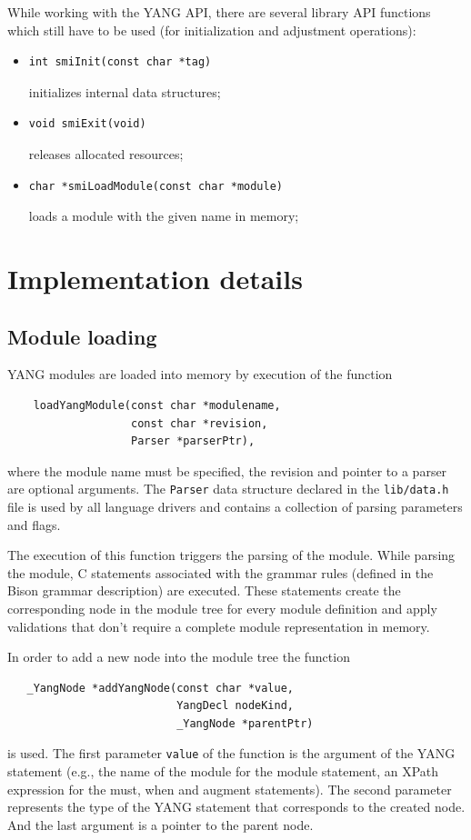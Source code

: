 \documentclass[conference]{IEEEtran}
\begin{document}
While working with the YANG API, there are several library API functions which still have to be used (for initialization and adjustment operations):
\begin{itemize}
\item 
\small
\begin{verbatim}
int smiInit(const char *tag)
\end{verbatim}
\normalsize
initializes internal data structures;

\item 
\small
\begin{verbatim}
void smiExit(void)
\end{verbatim}
\normalsize
releases allocated resources;

\item 
\small
\begin{verbatim}
char *smiLoadModule(const char *module)
\end{verbatim}
\normalsize
loads a module with the given name in memory;
\end{itemize}

\section{Implementation details}
\subsection{Module loading}
YANG modules are loaded into memory by execution of the function 
\small
\begin{verbatim}
    loadYangModule(const char *modulename, 
                   const char *revision, 
                   Parser *parserPtr),
\end{verbatim}
\normalsize
where the module name must be specified, the revision and pointer to a parser are optional arguments. The \texttt{Parser} data structure declared in the \texttt{lib/data.h} file is used by all language drivers and contains a collection of parsing parameters and flags.

The execution of this function triggers the parsing of the module. 
While parsing the module, C statements associated with the grammar rules (defined in the Bison grammar description) are executed. 
These statements create the corresponding node in the module tree for every module definition
and apply validations that don't require a complete module representation in memory.

In order to add a new node into the module tree the function
\small
\begin{verbatim}
   _YangNode *addYangNode(const char *value, 
                          YangDecl nodeKind, 
                          _YangNode *parentPtr)
\end{verbatim}
\normalsize
is used.
The first parameter \texttt{value} of the function is the argument of the YANG statement 
(e.g., the name of the module for the module statement, an XPath expression for the must, when and augment statements). 
The second parameter represents the type of the YANG statement that corresponds to the created node. And the last argument is a pointer to the parent node.
\end{document}

